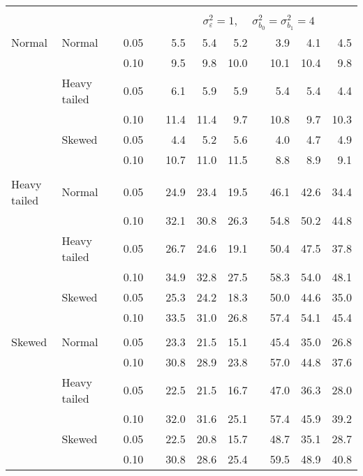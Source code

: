 \begin{table}[ht]
\begin{scriptsize}
\begin{center}
\begin{tabular}{ll p{.1cm} c p{.1cm} rrr p{.1cm} rrr}
&&&&&&&&&&&\\
& && && \multicolumn{7}{c}{$\sigma_{\varepsilon}^2 = 1$, \ \ $\sigma_{b_0}^2 = \sigma_{b_1}^2 = 4$} \\ \cline{6-12}
\rowcolor{gray!20}Normal       & Normal       && 0.05 &&   5.5 & 5.4 & 5.2 &   & 3.9 & 4.1 & 4.5 \\ 
\rowcolor{gray!20}             &              && 0.10 &&   9.5 & 9.8 & 10.0 &   & 10.1 & 10.4 & 9.8 \\ 
\rowcolor{gray!20}             & Heavy tailed && 0.05 &&   6.1 & 5.9 & 5.9 &   & 5.4 & 5.4 & 4.4 \\ 
\rowcolor{gray!20}             &              && 0.10 &&   11.4 & 11.4 & 9.7 &   & 10.8 & 9.7 & 10.3 \\ 
\rowcolor{gray!20}             & Skewed       && 0.05 &&   4.4 & 5.2 & 5.6 &   & 4.0 & 4.7 & 4.9 \\ 
\rowcolor{gray!20}             &              && 0.10 &&   10.7 & 11.0 & 11.5 &   & 8.8 & 8.9 & 9.1 \\ 
&&&&&&&&&&&\\
Heavy tailed & Normal       && 0.05 &&   24.9 & 23.4 & 19.5 &   & 46.1 & 42.6 & 34.4 \\ 
             &              && 0.10 &&   32.1 & 30.8 & 26.3 &   & 54.8 & 50.2 & 44.8 \\ 
             & Heavy tailed && 0.05 &&   26.7 & 24.6 & 19.1 &   & 50.4 & 47.5 & 37.8 \\ 
             &              && 0.10 &&   34.9 & 32.8 & 27.5 &   & 58.3 & 54.0 & 48.1 \\ 
             & Skewed       && 0.05 &&   25.3 & 24.2 & 18.3 &   & 50.0 & 44.6 & 35.0 \\ 
             &              && 0.10 &&   33.5 & 31.0 & 26.8 &   & 57.4 & 54.1 & 45.4 \\ 
&&&&&&&&&&&\\
Skewed       & Normal       && 0.05 &&   23.3 & 21.5 & 15.1 &   & 45.4 & 35.0 & 26.8 \\ 
             &              && 0.10 &&   30.8 & 28.9 & 23.8 &   & 57.0 & 44.8 & 37.6 \\ 
             & Heavy tailed && 0.05 &&   22.5 & 21.5 & 16.7 &   & 47.0 & 36.3 & 28.0 \\ 
             &              && 0.10 &&   32.0 & 31.6 & 25.1 &   & 57.4 & 45.9 & 39.2 \\ 
             & Skewed       && 0.05 &&   22.5 & 20.8 & 15.7 &   & 48.7 & 35.1 & 28.7 \\ 
             &              && 0.10 &&   30.8 & 28.6 & 25.4 &   & 59.5 & 48.9 & 40.8 \\ 

\hline
\end{tabular}
\end{center}
\end{scriptsize}
\end{table}

